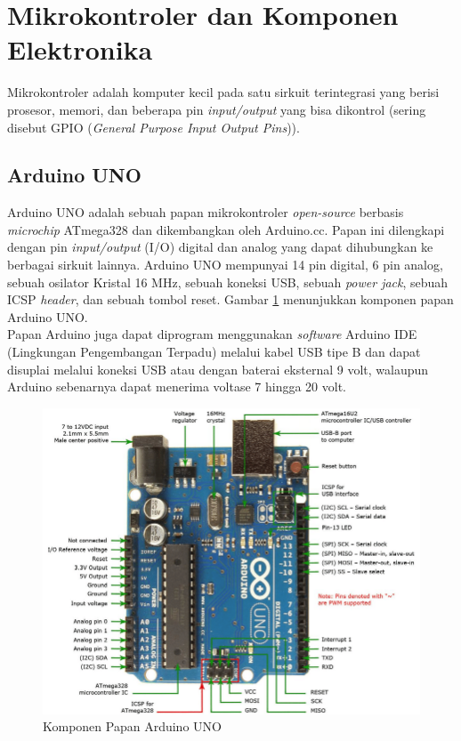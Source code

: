 \section{Mikrokontroler dan Komponen Elektronika}
\tab Mikrokontroler adalah komputer kecil pada satu sirkuit terintegrasi yang berisi prosesor, memori, dan beberapa pin \textit{input/output} yang bisa dikontrol (sering disebut GPIO (\textit{General Purpose Input Output Pins})).

\subsection{Arduino UNO}
\tab Arduino UNO adalah sebuah papan mikrokontroler \textit{open-source} berbasis \textit{microchip} ATmega328 dan dikembangkan oleh Arduino.cc. Papan ini dilengkapi dengan pin \textit{input/output} (I/O) digital dan analog yang dapat dihubungkan ke berbagai sirkuit lainnya. Arduino UNO mempunyai 14 pin digital, 6 pin analog, sebuah osilator Kristal 16 MHz, sebuah koneksi USB, sebuah \textit{power jack}, sebuah ICSP \textit{header}, dan sebuah tombol reset. Gambar \ref{figure:arduino-uno-pinout} menunjukkan komponen papan Arduino UNO.\\
\tab Papan Arduino juga dapat diprogram menggunakan \textit{software} Arduino IDE (Lingkungan Pengembangan Terpadu) melalui kabel USB tipe B dan dapat disuplai melalui koneksi USB atau dengan baterai eksternal 9 volt, walaupun Arduino sebenarnya dapat menerima voltase 7 hingga 20 volt.

\begin{figure}[H]
	\centerline {
		\includegraphics[width=\linewidth]{bab3/img/arduino-uno-pinout.png}
	}
	\caption{Komponen Papan Arduino UNO}
	\label{figure:arduino-uno-pinout}
\end{figure}

